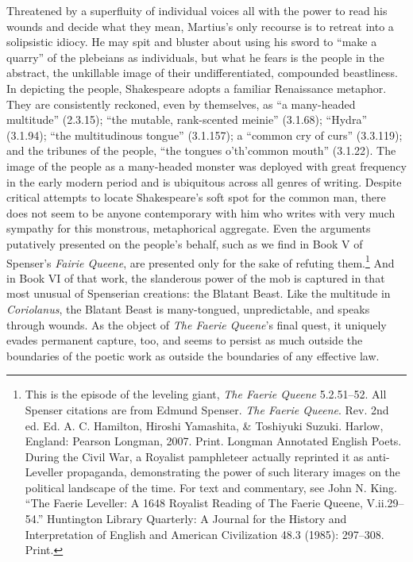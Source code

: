Threatened by a superfluity of individual voices all with the power to read his wounds and decide what they mean, Martius's only recourse is to retreat into a solipsistic idiocy.
He may spit and bluster about using his sword to ``make a quarry'' of the plebeians as individuals, but what he fears is the people in the abstract, the unkillable image of their undifferentiated, compounded beastliness.
In depicting the people, Shakespeare adopts a familiar Renaissance metaphor.
They are consistently reckoned, even by themselves, as ``a many-headed multitude'' (2.3.15); ``the mutable, rank-scented meinie'' (3.1.68); ``Hydra'' (3.1.94); ``the multitudinous tongue'' (3.1.157); a ``common cry of curs'' (3.3.119); and the tribunes of the people, ``the tongues o'th'common mouth'' (3.1.22).
The image of the people as a many-headed monster was deployed with great frequency in the early modern period and is ubiquitous across all genres of writing.
Despite critical attempts to locate Shakespeare's soft spot for the common man, there does not seem to be anyone contemporary with him who writes with very much sympathy for this monstrous, metaphorical aggregate.
Even the arguments putatively presented on the people's behalf, such as we find in Book V of Spenser's \emph{Fairie Queene}, are presented only for the sake of refuting them.\footnote{This is the episode of the leveling giant, \emph{The Faerie Queene} 5.2.51--52. All Spenser citations are from Edmund Spenser. \emph{The Faerie Queene}. Rev. 2nd ed. Ed. A. C. Hamilton, Hiroshi Yamashita, \& Toshiyuki Suzuki. Harlow, England: Pearson Longman, 2007. Print. Longman Annotated English Poets. \nocite{spenser_faerie_2007}
During the Civil War, a Royalist pamphleteer actually reprinted it as anti-Leveller propaganda, demonstrating the power of such literary images on the political landscape of the time.
For text and commentary, see John N. King. ``The Faerie Leveller: A 1648 Royalist Reading of The Faerie Queene, V.ii.29--54.'' Huntington Library Quarterly: A Journal for the History and Interpretation of English and American Civilization 48.3 (1985): 297–308. Print. \nocite{king_faerie_1985}} 
And in Book VI of that work, the slanderous power of the mob is captured in that most unusual of Spenserian creations: the Blatant Beast.
Like the multitude in \emph{Coriolanus}, the Blatant Beast is many-tongued, unpredictable, and speaks through wounds.
As the object of \emph{The Faerie Queene}'s final quest, it uniquely evades permanent capture, too, and seems to persist as much outside the boundaries of the poetic work as outside the boundaries of any effective law.
